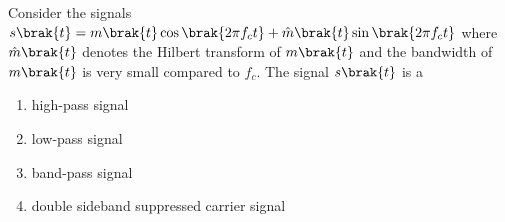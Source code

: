     \hfill{}

    \item Consider the signals $s\brak{t}=m\brak{t}\cos\brak{2\pi f_{c}t}+\hat{m}\brak{t}\sin\brak{2\pi f_{c}t}$ where $\hat{m}\brak{t}$ denotes the Hilbert transform of $m\brak{t}$ and the bandwidth of $m\brak{t}$ is very small compared to $f_{c}$. The signal $s\brak{t}$ is a
    \begin{enumerate}
        \item high-pass signal
        \item low-pass signal
        \item band-pass signal
        \item double sideband suppressed carrier signal
    \end{enumerate}
    
    \hfill{}

